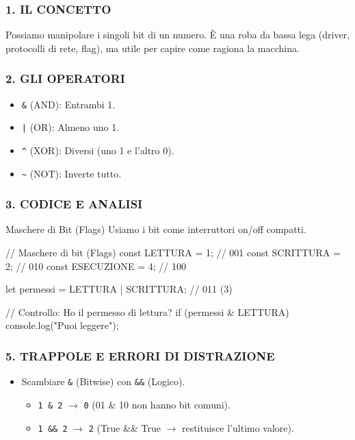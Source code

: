 \subsubsection*{1. IL CONCETTO}
Possiamo manipolare i singoli bit di un numero. È una roba da bassa lega (driver, protocolli di rete, flag), ma utile per capire come ragiona la macchina.

\subsubsection*{2. GLI OPERATORI}
\begin{itemize}
    \item \texttt{\&} (AND): Entrambi 1.
    \item \texttt{|} (OR): Almeno uno 1.
    \item \texttt{\^} (XOR): Diversi (uno 1 e l'altro 0).
    \item \texttt{\textasciitilde} (NOT): Inverte tutto.
\end{itemize}

\subsubsection*{3. CODICE E ANALISI}
\begin{concept}{Maschere di Bit (Flags)}
Usiamo i bit come interruttori on/off compatti.
\end{concept}
\begin{jsbox}
// Maschere di bit (Flags)
const LETTURA = 1;  // 001
const SCRITTURA = 2; // 010
const ESECUZIONE = 4; // 100

let permessi = LETTURA | SCRITTURA; // 011 (3)

// Controllo: Ho il permesso di lettura?
if (permessi & LETTURA) {
    console.log("Puoi leggere");
}
\end{jsbox}

\subsubsection*{5. TRAPPOLE E ERRORI DI DISTRAZIONE}
\begin{itemize}
    \item Scambiare \texttt{\&} (Bitwise) con \texttt{\&\&} (Logico).
    \begin{itemize}
        \item \texttt{1 \& 2} $\rightarrow$ \texttt{0} (01 \& 10 non hanno bit comuni).
        \item \texttt{1 \&\& 2} $\rightarrow$ \texttt{2} (True \&\& True $\rightarrow$ restituisce l'ultimo valore).
    \end{itemize}
\end{itemize}
